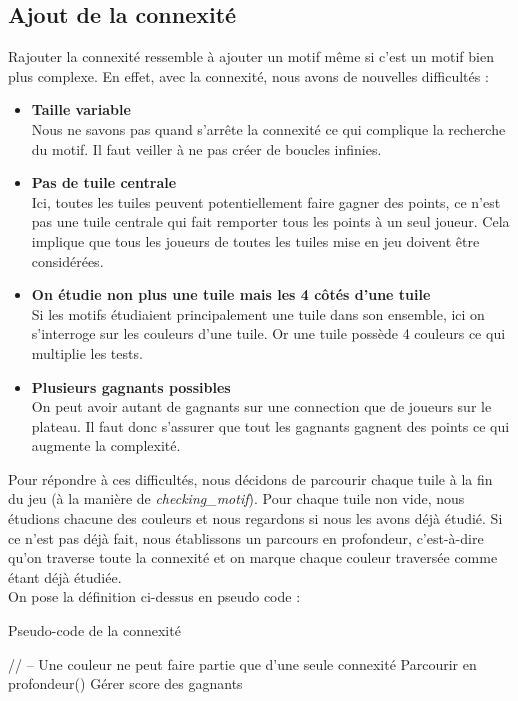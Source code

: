 \documentclass[a4paper]{article}
\begin{document}
\subsection{Ajout de la connexité}
Rajouter la connexité ressemble à ajouter un motif même si c'est un motif bien plus complexe. En effet, avec la connexité, nous avons de nouvelles difficultés :
\newline
\begin{itemize}
    \item \textbf{Taille variable} \\
Nous ne savons pas quand s'arrête la connexité ce qui complique la recherche du motif. Il faut veiller à ne pas créer de boucles infinies.
    \item \textbf{Pas de tuile centrale} \\
Ici, toutes les tuiles peuvent potentiellement faire gagner des points, ce n'est pas une tuile centrale qui fait remporter tous les points à un seul joueur. Cela implique que tous les joueurs de toutes les tuiles mise en jeu doivent être considérées.
    \item \textbf{On étudie non plus une tuile mais les 4 côtés d'une tuile} \\
Si les motifs étudiaient principalement une tuile dans son ensemble, ici on s'interroge sur les couleurs d'une tuile. Or une tuile possède 4 couleurs ce qui multiplie les tests.
    \item \textbf{Plusieurs gagnants possibles} \\
On peut avoir autant de gagnants sur une connection que de joueurs sur le plateau. Il faut donc s'assurer que tout les gagnants gagnent des points ce qui augmente la complexité. \\
\end{itemize}

Pour répondre à ces difficultés, nous décidons de parcourir chaque tuile à la fin du jeu (à la manière de \emph{checking\_motif}). Pour chaque tuile non vide, nous étudions chacune des couleurs et nous regardons si nous les avons déjà étudié. Si ce n'est pas déjà fait, nous établissons un parcours en profondeur, c'est-à-dire qu'on traverse toute la connexité et on marque chaque couleur traversée comme étant déjà étudiée. \\

On pose la définition ci-dessus en pseudo code :

\begin{algorithm}
    \caption{Pseudo-code de la connexité}
    \begin{algorithmic}
                        \STATE // --  Une couleur ne peut faire partie que d'une seule connexité
                        \STATE Parcourir en profondeur()
                        \STATE Gérer score des gagnants
                    \ENDIF
                \ENDFOR
            \ENDFOR 
        \ENDFOR
    \end{algorithmic}
\end{algorithm}
\end{document}
